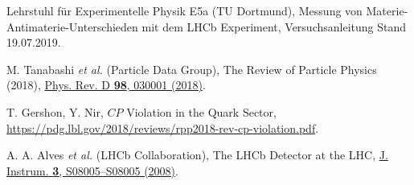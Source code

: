 \begin{thebibliography}{99}
  Lehrstuhl für Experimentelle Physik E5a (TU Dortmund),
  Messung von Materie-Antimaterie-Unterschieden mit dem LHCb Experiment,
  Versuchsanleitung Stand 19.07.2019.

  M. Tanabashi \textit{et al.} (Particle Data Group),
  The Review of Particle Physics (2018),
  \href{https://journals.aps.org/prd/abstract/10.1103/PhysRevD.98.030001}
  {Phys. Rev. D \textbf{98}, 030001 (2018)}.

  T. Gershon, Y. Nir,
  $CP$ Violation in the Quark Sector,
  \url{https://pdg.lbl.gov/2018/reviews/rpp2018-rev-cp-violation.pdf}.

  A. A. Alves \textit{et al.} (LHCb Collaboration),
  The LHCb Detector at the LHC,
  \href{https://doi.org/10.1088%2F1748-0221%2F3%2F08%2Fs08005}
  {J. Instrum. \textbf{3}, S08005--S08005 (2008)}.


\end{thebibliography}
